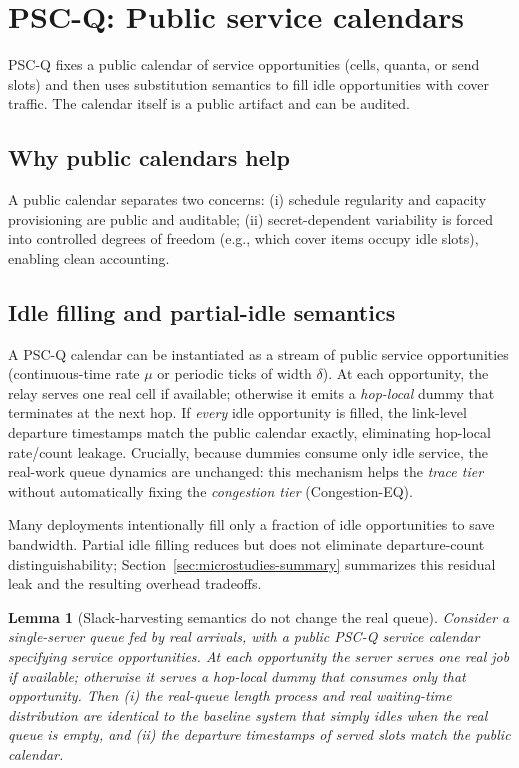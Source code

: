 \documentclass[11pt]{article}
\newtheorem{lemma}{Lemma}
\theoremstyle{definition}
\theoremstyle{remark}
\begin{document}
\section{PSC-Q: Public service calendars}
PSC-Q fixes a public calendar of service opportunities (cells, quanta, or send slots) and then uses substitution semantics to fill idle opportunities with cover traffic.
The calendar itself is a public artifact and can be audited.

\subsection{Why public calendars help}
A public calendar separates two concerns:
(i) schedule regularity and capacity provisioning are public and auditable;
(ii) secret-dependent variability is forced into controlled degrees of freedom (e.g., which cover items occupy idle slots), enabling clean accounting.

\subsection{Idle filling and partial-idle semantics}
A PSC-Q calendar can be instantiated as a stream of public service opportunities (continuous-time rate $\mu$ or periodic ticks of width $\delta$).
At each opportunity, the relay serves one real cell if available; otherwise it emits a \emph{hop-local} dummy that terminates at the next hop.
If \emph{every} idle opportunity is filled, the link-level departure timestamps match the public calendar exactly, eliminating hop-local rate/count leakage.
Crucially, because dummies consume only idle service, the real-work queue dynamics are unchanged: this mechanism helps the \emph{trace tier} without automatically fixing the \emph{congestion tier} (Congestion-EQ).

Many deployments intentionally fill only a fraction of idle opportunities to save bandwidth.
Partial idle filling reduces but does not eliminate departure-count distinguishability; Section~\ref{sec:microstudies-summary} summarizes this residual leak and the resulting overhead tradeoffs.

\begin{lemma}[Slack-harvesting semantics do not change the real queue]
Consider a single-server queue fed by \emph{real} arrivals, with a public PSC-Q service calendar specifying service opportunities.
At each opportunity the server serves one real job if available; otherwise it serves a hop-local dummy that consumes only that opportunity.
Then (i) the real-queue length process and real waiting-time distribution are identical to the baseline system that simply idles when the real queue is empty, and (ii) the departure timestamps of \emph{served slots} match the public calendar.
\end{lemma}
\end{document}
